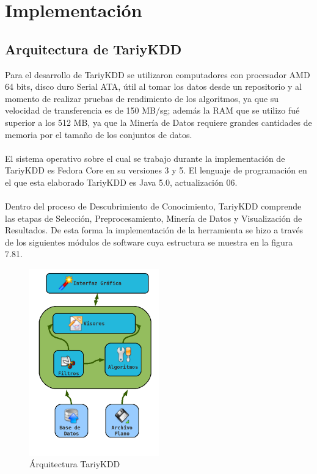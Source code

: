 \section{Implementaci\'on}
\subsection{Arquitectura de TariyKDD}
Para el desarrollo de TariyKDD se utilizaron computadores con procesador AMD 64 bits, disco duro Serial ATA,
\'util  al tomar los datos desde un repositorio y al momento de realizar pruebas de rendimiento de los
algoritmos, ya que su velocidad de transferencia es de 150 MB/sg; adem\'as la RAM que se utilizo fu\'e
superior a los 512 MB, ya que la Miner\'ia de Datos requiere grandes cantidades de memoria por el tama\~no de
los conjuntos de datos.\\
\\
El sistema operativo sobre el cual se trabajo durante la implementaci\'on de TariyKDD es Fedora Core en su
versiones 3 y 5. El lenguaje de programaci\'on en el que esta elaborado TariyKDD es Java 5.0, 
actualizaci\'on 06.\\
\\
Dentro del proceso de Descubrimiento de Conocimiento, TariyKDD comprende las etapas de Selecci\'on,
Preprocesamiento, Miner\'ia de Datos y Visualizaci\'on de Resultados. De esta forma la implementaci\'on de la
herramienta se hizo a trav\'es de los siguientes m\'odulos de software cuya estructura se muestra en la figura 7.81.

\begin{figure}[ht]
\centering
\includegraphics[width=0.5\textwidth]{images/arquitectura.png}
\caption{\'Arquitectura TariyKDD}
\end{figure}

